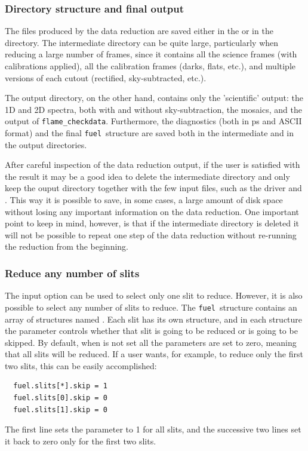 \documentclass[a4paper]{article}
\newcommand{\fuel}{\texttt{fuel}}
\begin{document}
\begin{sloppypar}
\subsubsection{Directory structure and final output}
\label{sec:dir_structure}

The files produced by the data reduction are saved either in the  or in the  directory. The intermediate directory can be quite large, particularly when reducing a large number of frames, since it contains all the science frames (with calibrations applied), all the calibration frames (darks, flats, etc.), and multiple versions of each cutout (rectified, sky-subtracted, etc.).

The output directory, on the other hand, contains only the 'scientific' output: the 1D and 2D spectra, both with and without sky-subtraction, the mosaics, and the output of \texttt{flame\_checkdata}. Furthermore, the diagnostics (both in ps and ASCII format) and the final \fuel\ structure are saved both in the intermediate and in the output directories.

After careful inspection of the data reduction output, if the user is satisfied with the result it may be a good idea to delete the intermediate directory and only keep the ouput directory together with the few input files, such as the driver and . This way it is possible to save, in some cases, a large amount of disk space without losing any important information on the data reduction. One important point to keep in mind, however, is that if the intermediate directory is deleted it will not be possible to repeat one step of the data reduction without re-running the reduction from the beginning.


\subsubsection{Reduce any number of slits}

The input option  can be used to select only one slit to reduce. However, it is also possible to select any number of slits to reduce. The \fuel\ structure contains an array of structures named . Each slit has its own structure, and in each structure the parameter  controls whether that slit is going to be reduced or is going to be skipped. By default, when   is not set all the  parameters are set to zero, meaning that all slits will be reduced. If a user wants, for example, to reduce only the first two slits, this can be easily accomplished:
\begin{lstlisting}
  fuel.slits[*].skip = 1
  fuel.slits[0].skip = 0
  fuel.slits[1].skip = 0
\end{lstlisting}
The first line sets the  parameter to 1 for all slits, and the successive two lines set it back to zero only for the first two slits.



\end{sloppypar}
\end{document}
